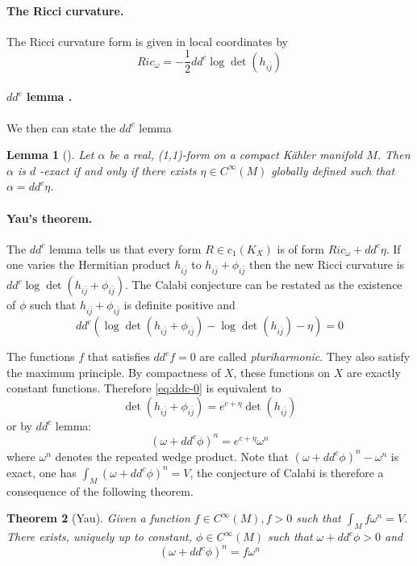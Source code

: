 \documentclass[11pt]{article}
\newtheorem{theorem}{Theorem}
\newtheorem{lemma}[theorem]{Lemma}
\begin{document}
\paragraph{The Ricci curvature.}
\label{sec:org38fe6b4}
The Ricci curvature form is given in local coordinates by
\[
Ric_{\omega} = -\frac{1}{2}dd^c\log\det(h_{i\bar j})
\]


\paragraph{\(dd^c\) lemma .}
\label{sec:org77ef14c}
We then can state the \(dd^c\) lemma
\begin{lemma}[]
Let \(\alpha\) be a real, (1,1)-form on a compact Kähler manifold \(M\). Then \(\alpha\) is \(d\) -exact if
and only if there exists \(\eta\in C^\infty(M)\) globally defined such that \(\alpha = dd^c\eta\).
\end{lemma}

\paragraph{Yau's theorem.}
\label{sec:org32b43cf}
The \(dd^c\) lemma tells us that every form \(R\in c_1(K_X)\) is of form \(Ric_{\omega} + dd^c\eta\). If one
varies the Hermitian product \(h_{i\bar j}\) to \(h_{i\bar j} + \phi_{i\bar j}\) then the new Ricci
curvature is \(dd^c\log\det(h_{i\bar j} + \phi_{i\bar j})\). The Calabi conjecture can be restated as
the existence of \(\phi\) such that \(h_{i\bar j} + \phi_{i\bar j}\) is definite positive and
\begin{equation}
\label{eq:ddc-0}
dd^c\left( \log\det(h_{i\bar j} + \phi_{i\bar j}) - \log\det(h_{i\bar j}) -\eta\right) = 0
\end{equation}

The functions \(f\) that satisfies \(dd^cf = 0\) are called \emph{pluriharmonic}. They also satisfy the
maximum principle. By compactness of \(X\), these functions on \(X\) are exactly constant
functions. Therefore \eqref{eq:ddc-0} is equivalent to
\[
\det(h_{i\bar j} + \phi_{i\bar j}) = e^{c+\eta}\det(h_{i \bar j})
\]
or by \(dd^c\) lemma:
\[
(\omega + dd^c\phi)^n = e^{c+\eta}\omega^n
\]
where \(\omega^n\) denotes the repeated wedge product. Note that \((\omega +dd^c\phi)^n - \omega^n\) is exact,
one has \(\int_M (\omega +dd^c\phi)^n = V\), the conjecture of Calabi is therefore a consequence of
the following theorem.

\begin{theorem}[Yau]
Given a function \(f\in C^\infty(M), f>0\) such that \(\int_M f\omega^n = V\). There exists, uniquely
up to constant, \(\phi\in C^\infty(M)\) such that \(\omega + dd^c\phi >0\) and
\[
(\omega + dd^c\phi)^n = f\omega^n
\]
\end{theorem}
\end{document}
